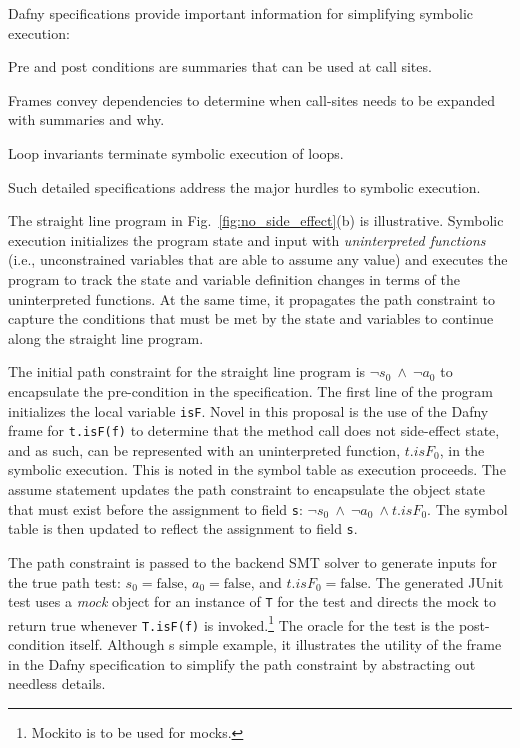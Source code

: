 \documentclass[11pt,onecolumn,notitlepage]{article}
\newcommand{\figref}[1]{Fig.~\ref{#1}}
\begin{document}
Dafny specifications provide important information for simplifying symbolic execution:
\begin{compactitem}
  \item Pre and post conditions are summaries that can be used at call sites.
  \item Frames convey dependencies to determine when call-sites needs to be expanded with summaries and why.
  \item Loop invariants terminate symbolic execution of loops.
\end{compactitem}
Such detailed specifications address the major hurdles to symbolic execution.

The straight line program in \figref{fig:no_side_effect}(b) is illustrative. Symbolic execution initializes the program state and input with \emph{uninterpreted functions} (i.e., unconstrained variables that are able to assume any value) and executes the program to track the state and variable definition changes in terms of the uninterpreted functions. At the same time, it propagates the path constraint to capture the conditions that must be met by the state and variables to continue along the straight line program.

The initial path constraint for the straight line program is $\neg s_0\ \wedge\ \neg a_0$ to encapsulate the pre-condition in the specification. The first line of the program initializes the local variable \texttt{isF}. Novel in this proposal is the use of the Dafny frame for \texttt{t.isF(f)} to determine that the method call does not side-effect state, and as such, can be represented with an uninterpreted function, $\mathit{t.isF}_0$, in the symbolic execution. This is noted in the symbol table as execution proceeds. The assume statement updates the path constraint to encapsulate the object state that must exist before the assignment to field \texttt{s}: $\neg s_0\ \wedge\ \neg a_0\ \wedge \mathit{t.isF}_0$. The symbol table is then updated to reflect the assignment to field \texttt{s}.

The path constraint is passed to the backend SMT solver to generate inputs for the true path test: $s_0 = \mathrm{false}$, $a_0 = \mathrm{false}$, and $\mathit{t.isF}_0 = \mathrm{false}$. The generated JUnit test uses a \emph{mock} object for an instance of \texttt{T} for the test and directs the mock to return true whenever \texttt{T.isF(f)} is invoked.\footnote{Mockito is to be used for mocks.} The oracle for the test is the post-condition itself. Although s simple example, it illustrates the utility of the frame in the Dafny specification to simplify the path constraint by abstracting out needless details. 
\end{document}
